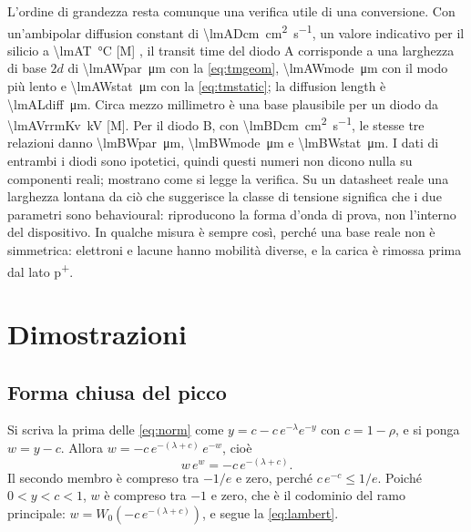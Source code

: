 \documentclass[10pt,a4paper]{scrartcl}
\begin{document}
L'ordine di grandezza resta comunque una verifica utile di una conversione. Con un'ambipolar diffusion constant di \SI{\lmADcm}{\centi\metre\squared\per\second}, un valore indicativo per il silicio a \SI{\lmAT}{\celsius} [M] \cite{lutz}, il transit time del diodo A corrisponde a una larghezza di base $2d$ di \SI{\lmAWpar}{\micro\metre} con la \eqref{eq:tmgeom}, \SI{\lmAWmode}{\micro\metre} con il modo più lento e \SI{\lmAWstat}{\micro\metre} con la \eqref{eq:tmstatic}; la diffusion length è \SI{\lmALdiff}{\micro\metre}. Circa mezzo millimetro è una base plausibile per un diodo da \SI{\lmAVrrmKv}{\kilo\volt} [M]. Per il diodo B, con \SI{\lmBDcm}{\centi\metre\squared\per\second}, le stesse tre relazioni danno \SI{\lmBWpar}{\micro\metre}, \SI{\lmBWmode}{\micro\metre} e \SI{\lmBWstat}{\micro\metre}. I dati di entrambi i diodi sono ipotetici, quindi questi numeri non dicono nulla su componenti reali; mostrano come si legge la verifica. Su un datasheet reale una larghezza lontana da ciò che suggerisce la classe di tensione significa che i due parametri sono behavioural: riproducono la forma d'onda di prova, non l'interno del dispositivo. In qualche misura è sempre così, perché una base reale non è simmetrica: elettroni e lacune hanno mobilità diverse, e la carica è rimossa prima dal lato p\textsuperscript{+}.

\section{Dimostrazioni}
\label{app:proofs}
\subsection{Forma chiusa del picco}
\label{app:lambert}
Si scriva la prima delle \eqref{eq:norm} come $y = c - c\,e^{-\lambda}e^{-y}$ con $c = 1-\rho$, e si ponga $w = y - c$. Allora $w = -c\,e^{-(\lambda+c)}\,e^{-w}$, cioè
\begin{equation}
w\,e^{w} = -c\,e^{-(\lambda+c)} .
\end{equation}
Il secondo membro è compreso tra $-1/e$ e zero, perché $c\,e^{-c} \leq 1/e$. Poiché $0 < y < c < 1$, $w$ è compreso tra $-1$ e zero, che è il codominio del ramo principale: $w = W_0(-c\,e^{-(\lambda+c)})$, e segue la \eqref{eq:lambert}.
\end{document}
